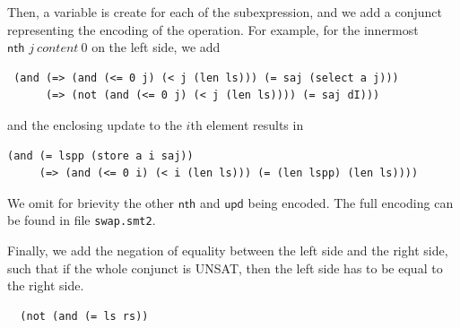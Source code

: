 \documentclass[onecolumn, preprint]{sigplanconf}
\newcommand{\nth}[3]{\textsf{nth } #1\ #2\ #3}
\begin{document}
Then, a variable is create for each of the subexpression, and we add a conjunct representing the encoding of the operation. For example, for the innermost $\nth{j}{content}{0}$ on the left side, we add

\begin{lstlisting}
 (and (=> (and (<= 0 j) (< j (len ls))) (= saj (select a j)))
      (=> (not (and (<= 0 j) (< j (len ls)))) (= saj dI)))
\end{lstlisting}

and the enclosing update to the $i$th element results in

\begin{lstlisting}
(and (= lspp (store a i saj))
     (=> (and (<= 0 i) (< i (len ls))) (= (len lspp) (len ls))))
\end{lstlisting}

We omit for brievity the other $\textsf{nth}$ and $\textsf{upd}$ being encoded. The full encoding can be found in file \texttt{swap.smt2}.

Finally, we add the negation of equality between the left side and the right side, such that if the whole conjunct is UNSAT, then the left side has to be equal to the right side.

\begin{lstlisting}
  (not (and (= ls rs))
  \end{lstlisting}

\end{document}
